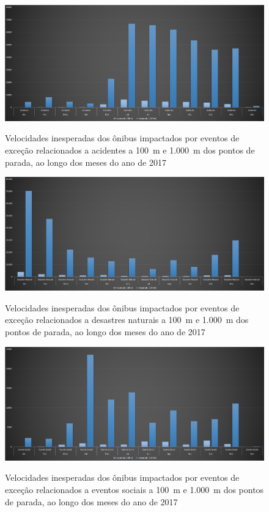 \documentclass[
	12pt,				%
	oneside,			%
	a4paper,			%
	english,			%
	brazil				%
	]{abntex2ppgsi}
\begin{document}
{{\begin{figure}[!htb]
	\centering
 	  \caption{Velocidades inesperadas dos ônibus impactados por eventos de exceção relacionados a acidentes a 100~m e 1.000~m dos pontos de parada, ao longo dos meses do ano de 2017}
		\includegraphics[width=1\linewidth]{images/apriori_analysis_stops_accidents.png}
	\label{fig:apriori_analysis_stops_accidents}
\end{figure}

\begin{figure}[!htb]
	\centering
 	  \caption{Velocidades inesperadas dos ônibus impactados por eventos de exceção relacionados a desastres naturais a 100~m e 1.000~m dos pontos de parada, ao longo dos meses do ano de 2017}
		\includegraphics[width=1\linewidth]{images/apriori_analysis_stops_natural_disasters.png}
	\label{fig:apriori_analysis_stops_natural_disasters}
\end{figure}

\begin{figure}[!htb]
	\centering
 	  \caption{Velocidades inesperadas dos ônibus impactados por eventos de exceção relacionados a eventos sociais a 100~m e 1.000~m dos pontos de parada, ao longo dos meses do ano de 2017}
		\includegraphics[width=1\linewidth]{images/apriori_analysis_stops_social_events.png}
	\label{fig:apriori_analysis_stops_social_events}
\end{figure}

}}
\end{document}
